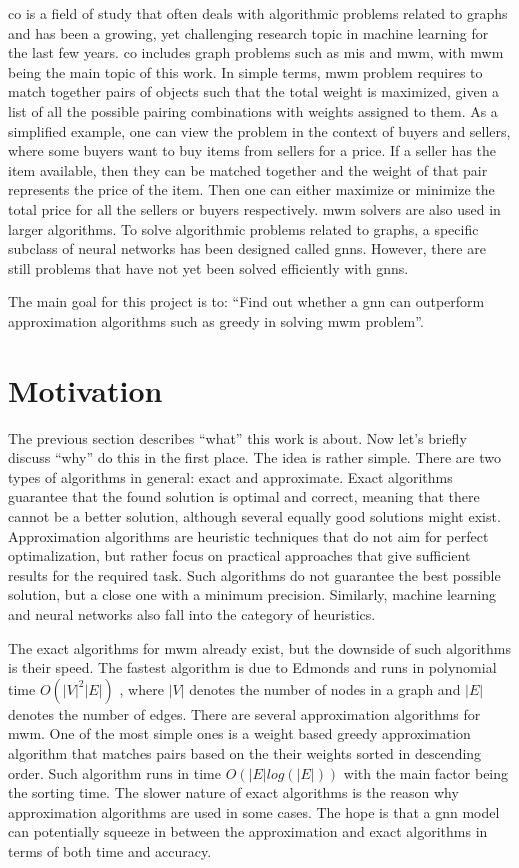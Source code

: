 \gls{co} is a field of study that often deals with algorithmic problems related to graphs and has been a growing, yet challenging research topic in machine learning for the last few years. \gls{co} includes graph problems such as \gls{mis} and \gls{mwm}, with \gls{mwm} being the main topic of this work. In simple terms, \gls{mwm} problem requires to match together pairs of objects such that the total weight is maximized, given a list of all the possible pairing combinations with weights assigned to them. As a simplified example, one can view the problem in the context of buyers and sellers, where some buyers want to buy items from sellers for a price. If a seller has the item available, then they can be matched together and the weight of that pair represents the price of the item. Then one can either maximize or minimize the total price for all the sellers or buyers respectively. \gls{mwm} solvers are also used in larger algorithms. To solve algorithmic problems related to graphs, a specific subclass of neural networks has been designed called \gls{gnn}s. However, there are still problems that have not yet been solved efficiently with \gls{gnn}s. 

The main goal for this project is to: “Find out whether a \gls{gnn} can outperform approximation algorithms such as greedy in solving \gls{mwm} problem”. 

\section{Motivation}

The previous section describes “what” this work is about. Now let's briefly discuss “why” do this in the first place. The idea is rather simple. There are two types of algorithms in general: exact and approximate. Exact algorithms guarantee that the found solution is optimal and correct, meaning that there cannot be a better solution, although several equally good solutions might exist. Approximation algorithms are heuristic techniques that do not aim for perfect optimalization, but rather focus on practical approaches that give sufficient results for the required task. Such algorithms do not guarantee the best possible solution, but a close one with a minimum precision. Similarly, machine learning and neural networks also fall into the category of heuristics.

The exact algorithms for \gls{mwm} already exist, but the downside of such algorithms is their speed. The fastest algorithm is due to Edmonds and runs in polynomial time $O(|V|^{2} |E| )$ \cite{runtimeBlossomWiki}, where $|V|$ denotes the number of nodes in a graph and $|E|$ denotes the number of edges. There are several approximation algorithms for \gls{mwm}. One of the most simple ones is a weight based greedy approximation algorithm that matches pairs based on the their weights sorted in descending order. Such algorithm runs in time $O(|E| log(|E|))$ with the main factor being the sorting time. The slower nature of exact algorithms is the reason why approximation algorithms are used in some cases. The hope is that a \gls{gnn} model can potentially squeeze in between the approximation and exact algorithms in terms of both time and accuracy.


